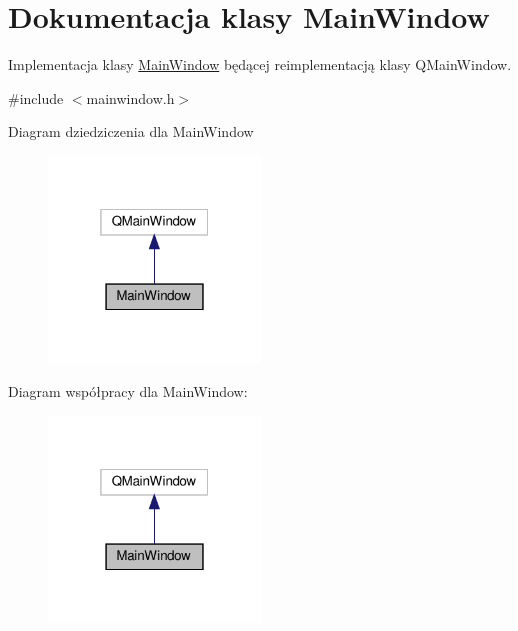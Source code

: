 \hypertarget{class_main_window}{}\section{Dokumentacja klasy Main\+Window}
\label{class_main_window}


Implementacja klasy \hyperlink{class_main_window}{Main\+Window} będącej reimplementacją klasy Q\+Main\+Window.  




{\ttfamily \#include $<$mainwindow.\+h$>$}



Diagram dziedziczenia dla Main\+Window\nopagebreak
\begin{figure}[H]
\begin{center}
\leavevmode
\includegraphics[width=160pt]{class_main_window__inherit__graph}
\end{center}
\end{figure}


Diagram współpracy dla Main\+Window\+:\nopagebreak
\begin{figure}[H]
\begin{center}
\leavevmode
\includegraphics[width=160pt]{class_main_window__coll__graph}
\end{center}
\end{figure}
